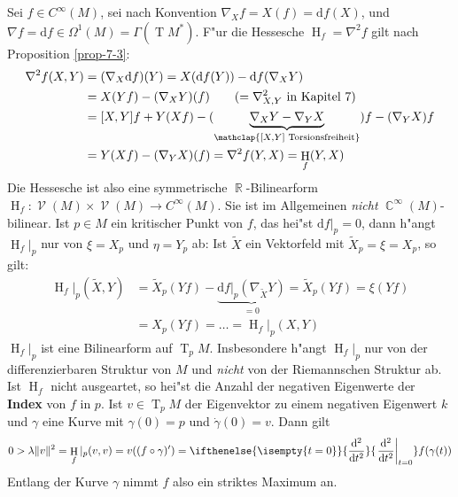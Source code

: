 \documentclass[paper=A4, twoside, chapterprefix=true, bibliography=totoc, headsepline]{scrbook}
\DeclareMathOperator{\C}{\mathbb{C}}
\DeclareMathOperator{\R}{\mathbb{R}}
\DeclareMathOperator{\calV}{\mathcal{V}}
\DeclareMathOperator{\Hh}{H} %
\DeclareMathOperator{\T}{T} %
\newcommand{\dop}{\mathrm{d}}
\newcommand{\X}{\times}
\newcommand{\difffrac}[3][]{\ifthenelse{\isempty{#1}}{\frac{\dop #2}{\dop #3}}{\left. \frac{\dop #2}{\dop #3} \right|_{#1}}}
\theoremstyle{plain}
\theoremstyle{nonumberplain}
\theoremstyle{empty}
\theoremstyle{break}
\newcommand{\CmIndex}[2][]{\ifthenelse{\isempty{#1}}{\index{#2}}{\index{#1}}#2}
\newcommand{\CmMark}[2][]{\textbf{\CmIndex[#1]{#2}}}
\begin{document}
Sei $f \in C^\infty(M)$, sei nach Konvention $\nabla_X f = X(f) = \dop f(X)$, und $\nabla f = \dop f \in \Omega^1(M) = \Gamma(\T M^*)$. F"ur die Hessesche $\Hh_f = \nabla^2 f$ gilt nach Proposition
\ref{prop-7-3}:
\begin{align*}
  \nabla^2 f (X,Y) &= (\nabla_X \dop f)(Y) = X(\dop f(Y)) - \dop f(\nabla_X Y)\\
  &= X(Yf) - (\nabla_X Y)(f) \qquad (= \nabla_{X,Y}^2 \text{ in Kapitel 7})\\
  &= [X,Y]f + Y(Xf) - (\underbrace{\nabla_X Y - \nabla_Y X}_{\mathclap{[X,Y] \text{ Torsionsfreiheit}}}) f - (\nabla_Y X) f\\
  &= Y(Xf) - (\nabla_YX)(f) = \nabla^2 f(Y,X) = \Hh_f(Y,X)
\end{align*}
Die Hessesche ist also eine symmetrische $\R$-Bilinearform $\Hh_f: \calV(M) \X \calV(M) \to C^\infty(M)$.
Sie ist im Allgemeinen \emph{nicht} $\C^\infty(M)$-bilinear.
Ist $p \in M$ ein kritischer Punkt von $f$, das hei"st $\dop f|_p = 0$, dann h"angt $\Hh_f|_p$ nur von $\xi = X_p$ und $\eta = Y_p$ ab:
Ist $\tilde X$ ein Vektorfeld mit $\tilde X_p = \xi = X_p$, so gilt:
\begin{align*}
  \Hh_f|_p(\tilde X,Y) &= \tilde X_p(Yf) - \underbrace{\dop f|_p(\nabla_{\tilde X}Y)}_{=0} = \tilde X_p(Yf) = \xi(Yf)\\
  &= X_p(Yf) = \ldots = \Hh_f|_p(X,Y)
\end{align*}
$\Hh_f|_p$ ist eine Bilinearform auf $\T_pM$. Insbesondere h"angt $\Hh_f|_p$ nur von der differenzierbaren Struktur von $M$ und \emph{nicht} von der Riemannschen Struktur ab.
Ist $\Hh_f$ nicht ausgeartet, so hei"st die Anzahl der negativen Eigenwerte der \CmMark{Index} von $f$ in $p$.
Ist $v \in \T_pM$ der Eigenvektor zu einem negativen Eigenwert $k$ und $\gamma$ eine Kurve mit
$\gamma(0)=p$ und $\dot\gamma(0)=v$.
Dann gilt
\begin{align*}
  0 > \lambda \| v \|^2 = \Hh_f|_p (v,v) = v((f \circ \gamma)') =
  \difffrac[t=0]{^2}{t^2} f(\gamma(t))
\end{align*}
Entlang der Kurve $\gamma$ nimmt $f$ also ein striktes Maximum an.
\end{document}
